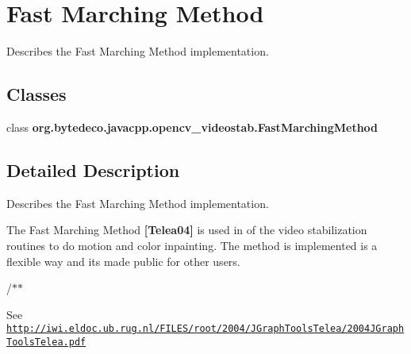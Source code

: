 \hypertarget{group__videostab__marching}{}\section{Fast Marching Method}
\label{group__videostab__marching}


Describes the Fast Marching Method implementation.  


\subsection*{Classes}
\begin{DoxyCompactItemize}
\item 
class {\bfseries org.\+bytedeco.\+javacpp.\+opencv\+\_\+videostab.\+Fast\+Marching\+Method}
\end{DoxyCompactItemize}


\subsection{Detailed Description}
Describes the Fast Marching Method implementation. 

The Fast Marching Method {\bfseries [Telea04]} is used in of the video stabilization routines to do motion and color inpainting. The method is implemented is a flexible way and it\textquotesingle{}s made public for other users. 

/$\ast$$\ast$

See \href{http://iwi.eldoc.ub.rug.nl/FILES/root/2004/JGraphToolsTelea/2004JGraphToolsTelea.pdf}{\tt http\+://iwi.\+eldoc.\+ub.\+rug.\+nl/\+F\+I\+L\+E\+S/root/2004/\+J\+Graph\+Tools\+Telea/2004\+J\+Graph\+Tools\+Telea.\+pdf} 